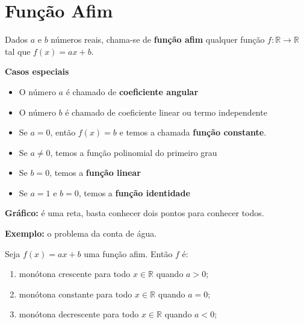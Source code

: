 \section{Função Afim}

\begin{frame}
  \begin{definition}
    Dados $a$ e $b$ números reais, chama-se de \textbf{função afim} qualquer função $f:\mathbb{R}\rightarrow\mathbb{R}$ tal que $f(x) = ax+b$.
  \end{definition}

  \textbf{Casos especiais}
  \begin{itemize}
    \item O número $a$ é chamado de \textbf{coeficiente angular}
    \item O número $b$ é chamado de coeficiente linear ou termo independente
    \item Se $a = 0$, então $f(x) = b$ e temos a chamada \textbf{função constante}.
    \item Se $a \not= 0$, temos a função polinomial do primeiro grau
    \item Se $b=0$, temos a \textbf{função linear}
    \item Se $a=1$ e $b=0$, temos a \textbf{função identidade}
  \end{itemize}

  \textbf{Gráfico:} é uma reta, basta conhecer dois pontos para conhecer todos.

  \textbf{Exemplo:} o problema da conta de água.
\end{frame}

\begin{frame}
  \begin{theorem}
    Seja $f(x) = ax + b$ uma função afim. Então $f$ é:
    \begin{enumerate}
      \item monótona crescente para todo $x\in\mathbb{R}$ quando $a>0$;
      \item monótona constante para todo $x\in\mathbb{R}$ quando $a=0$;
      \item monótona decrescente para todo $x\in\mathbb{R}$ quando $a<0$;
    \end{enumerate}
  \end{theorem}
  \begin{figure}
  \end{figure}
\end{frame}

